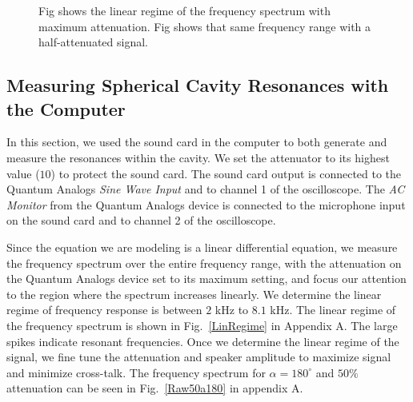 \documentclass[12pt]{article}
\renewcommand{\deg}{^\circ} %
\newcommand{\figref}[1]{Fig.\ \ref{#1}}
\begin{document}
		\begin{figure}[H]
			\captionsetup{justification = justified}
			\centering
			\qquad
			\caption{Fig \protect{} shows the linear regime of the frequency spectrum with maximum attenuation. Fig \protect{} shows that same frequency range with a half-attenuated signal.}
			\label{freqSpec}
		\end{figure}
		
		
		
		
		\subsection{Measuring Spherical Cavity Resonances with the Computer}
		In this section, we used the sound card in the computer to both generate and measure the resonances within the cavity. We set the attenuator to its highest value ($10$) to protect the sound card. The sound card output is connected to the Quantum Analogs \emph{Sine Wave Input} and to channel 1 of the oscilloscope. The \emph{AC Monitor} from the Quantum Analogs device is connected to the microphone input on the sound card and to channel 2 of the oscilloscope. 
		
		Since the equation we are modeling is a linear differential equation, we measure the frequency spectrum over the entire frequency range, with the attenuation on the Quantum Analogs device set to its maximum setting, and focus our attention to the region where the spectrum increases linearly. We determine the linear regime of frequency response is between $2$ kHz to $8.1$ kHz. The linear regime of the frequency spectrum is shown in \figref{LinRegime} in Appendix A. The large spikes indicate resonant frequencies. Once we determine the linear regime of the signal, we fine tune the attenuation and speaker amplitude to maximize signal and minimize cross-talk. The frequency spectrum for $\alpha = 180\deg$ and $50\%$ attenuation can be seen in \figref{Raw50a180} in appendix A.
		
\end{document}
